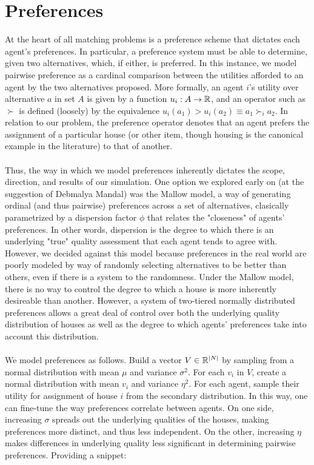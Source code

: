 \documentclass[12pt]{article}
\begin{document}
\section*{Preferences}
At the heart of all matching problems is a preference scheme that dictates each agent's preferences. In particular, a preference system must be able to determine, given two alternatives, which, if either, is preferred. In this instance, we model pairwise preference as a cardinal comparison between the utilities afforded to an agent by the two alternatives proposed. More formally, an agent $i$'s utility over alternative $a$ in set $A$ is given by a function $u_i: A \rightarrow {\Bbb R}$, and an operator such as $\succ$ is defined (loosely) by the equivalence $u_i(a_1) > u_i(a_2) \equiv a_1 \succ_i a_2$. In relation to our problem, the preference operator denotes that an agent prefers the assignment of a particular house (or other item, though housing is the canonical example in the literature) to that of another.\\\\
Thus, the way in which we model preferences inherently dictates the scope, direction, and results of our simulation. One option we explored early on (at the suggestion of Debmalya Mandal) was the Mallow model, a way of generating ordinal (and thus pairwise) preferences across a set of alternatives, clasically parametrized by a dispersion factor $\phi$ that relates the "closeness" of agents' preferences. In other words, dispersion is the degree to which there is an underlying "true" quality assessment that each agent tends to agree with. However, we decided against this model because preferences in the real world are poorly modeled by way of randomly selecting alternatives to be better than others, even if there is a system to the randomness. Under the Mallow model, there is no way to control the degree to which a house is more inherently desireable than another. However, a system of two-tiered normally distributed preferences allows a great deal of control over both the underlying quality distribution of houses as well as the degree to which agents' preferences take into account this distribution.\\\\We model preferences as follows. Build a vector $V \in {\Bbb R^{|N|}}$ by sampling from a normal distribution with mean $\mu$ and variance $\sigma^2$. For each $v_i$ in $V$, create a normal distribution with mean $v_i$ and variance $\eta^2$. For each agent, sample their utility for assignment of house $i$ from the secondary distribution. In this way, one can fine-tune the way preferences correlate between agents. On one side, increasing $\sigma$ spreads out the underlying qualities of the houses, making preferences more distinct, and thus less independent. On the other, increasing $\eta$ makes differences in underlying quality less significant in determining pairwise preferences. Providing a snippet:
\end{document}
